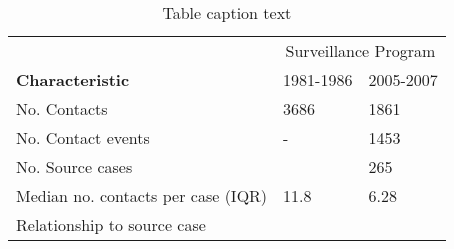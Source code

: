 \begin{table} %
\centering %
\caption{Table caption text} %
\begin{tabular}{p{6cm} p{3cm} p{3cm}} %
\toprule %
& \multicolumn{2}{c}{Surveillance Program} \\ %
\cmidrule(l){2-3} %
\textbf{Characteristic} & 1981-1986 & 2005-2007 \\ %
\midrule %
No. Contacts & 3686 & 1861 \\ %
No. Contact events & - & 1453 \\ %
No. Source cases & ~ & 265 \\ %
Median no. contacts per case (IQR) & 11.8 & 6.28 \\ %
Relationship to source case & ~ & ~ \\ %
\bottomrule %
\end{tabular}
\label{tab:template} %
\end{table}